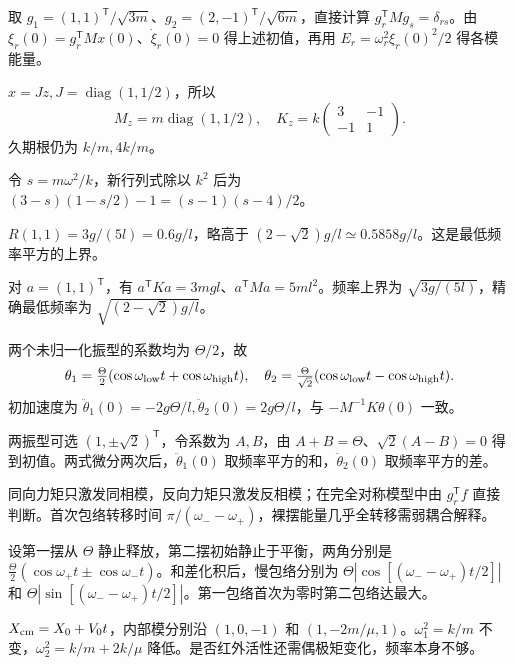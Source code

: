 \begin{bookexercises}
取 $g_1=(1,1)^{\mathsf T}/\sqrt{3m}$、$g_2=(2,-1)^{\mathsf T}/\sqrt{6m}$，直接计算 $g_r^{\mathsf T}Mg_s=\delta_{rs}$。由 $\xi_r(0)=g_r^{\mathsf T}Mx(0)$、$\dot\xi_r(0)=0$ 得上述初值，再用 $E_r=\omega_r^2\xi_r(0)^2/2$ 得各模能量。
\item $x=Jz,J=\operatorname{diag}(1,1/2)$，所以
\[
M_z=m\operatorname{diag}(1,1/2),\quad
K_z=k\begin{pmatrix}3&-1\\-1&1\end{pmatrix}.
\]
久期根仍为 $k/m,4k/m$。

令 $s=m\omega^2/k$，新行列式除以 $k^2$ 后为 $(3-s)(1-s/2)-1=(s-1)(s-4)/2$。
\item $R(1,1)=3g/(5l)=0.6g/l$，略高于 $(2-\sqrt2)g/l\simeq0.5858g/l$。这是最低频率平方的上界。

对 $a=(1,1)^{\mathsf T}$，有 $a^{\mathsf T}Ka=3mgl$、$a^{\mathsf T}Ma=5ml^2$。频率上界为 $\sqrt{3g/(5l)}$，精确最低频率为 $\sqrt{(2-\sqrt2)g/l}$。
\item 两个未归一化振型的系数均为 $\Theta/2$，故
\[
\theta_1=\tfrac\Theta2(\cos\omega_{\rm low}t+\cos\omega_{\rm high}t),\quad
\theta_2=\tfrac\Theta{\sqrt2}(\cos\omega_{\rm low}t-\cos\omega_{\rm high}t).
\]
初加速度为 $\ddot\theta_1(0)=-2g\Theta/l,\ddot\theta_2(0)=2g\Theta/l$，与 $-M^{-1}K\theta(0)$ 一致。

两振型可选 $(1,\pm\sqrt2)^{\mathsf T}$，令系数为 $A,B$，由 $A+B=\Theta$、$\sqrt2(A-B)=0$ 得到初值。两式微分两次后，$\ddot\theta_1(0)$ 取频率平方的和，$\ddot\theta_2(0)$ 取频率平方的差。
\item 同向力矩只激发同相模，反向力矩只激发反相模；在完全对称模型中由 $g_r^{\mathsf T}f$ 直接判断。首次包络转移时间 $\pi/(\omega_--\omega_+)$，裸摆能量几乎全转移需弱耦合解释。

设第一摆从 $\Theta$ 静止释放，第二摆初始静止于平衡，两角分别是 $\frac\Theta2(\cos\omega_+t\pm\cos\omega_-t)$。和差化积后，慢包络分别为 $\Theta|\cos[(\omega_--\omega_+)t/2]|$ 和 $\Theta|\sin[(\omega_--\omega_+)t/2]|$。第一包络首次为零时第二包络达最大。
\item $X_{\rm cm}=X_0+V_0t$，内部模分别沿 $(1,0,-1)$ 和 $(1,-2m/\mu,1)$。$\omega_1^2=k/m$ 不变，$\omega_2^2=k/m+2k/\mu$ 降低。是否红外活性还需偶极矩变化，频率本身不够。


\end{bookexercises}
